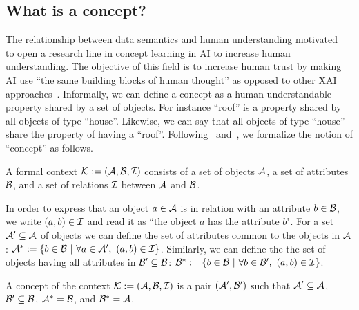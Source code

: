 \subsection{What is a concept?}
The relationship between data semantics and human understanding motivated~\citet{kim2018interpretability} to open a research line in concept learning in AI to increase human understanding. The objective of this field is to increase human trust by making AI use ``the same building blocks of human thought'' as opposed to other XAI approaches~\citep{kim2018interpretability}. Informally, we can define a concept as a human-understandable property shared by a set of objects. For instance ``roof'' is a property shared by all objects of type ``house''. Likewise, we can say that all objects of type ``house'' share the property of having a ``roof''.
Following~\citet{ganter1997formal} and~\citet{goguen2005concept}, we formalize the notion of ``concept'' as follows.
\begin{definition}
A formal context $\mathcal{K} := (\mathcal{A},\mathcal{B},\mathcal{I})$ consists of a set of objects $\mathcal{A}$, a set of attributes $\mathcal{B}$, and a set of relations $\mathcal{I}$ between $\mathcal{A}$ and $\mathcal{B}$.
\end{definition}
In order to express that an object $a \in \mathcal{A}$ is in relation with an attribute $b \in \mathcal{B}$, we write $(a, b) \in \mathcal{I}$ and read it as ``the object $a$ has the attribute $b$". For a set $\mathcal{A}' \subseteq \mathcal{A}$ of objects we can define the set of attributes common to the objects in $\mathcal{A}$: $\mathcal{A}^* := \{b \in \mathcal{B} \ | \ \forall a \in \mathcal{A}', \ (a,b) \in \mathcal{I} \}$. Similarly, we can define the the set of objects having all attributes in $\mathcal{B}' \subseteq \mathcal{B}$: $\mathcal{B}^* := \{b \in \mathcal{B} \ | \ \forall b \in \mathcal{B}', \ (a,b) \in \mathcal{I} \}$.
\begin{definition}
A concept of the context $\mathcal{K} := (\mathcal{A},\mathcal{B},\mathcal{I})$ is a pair $(\mathcal{A}',\mathcal{B}')$ such that $\mathcal{A}' \subseteq \mathcal{A}$, $\mathcal{B}' \subseteq \mathcal{B}$, $\mathcal{A}^* = \mathcal{B}$, and $\mathcal{B}^* = \mathcal{A}$.
\end{definition}

